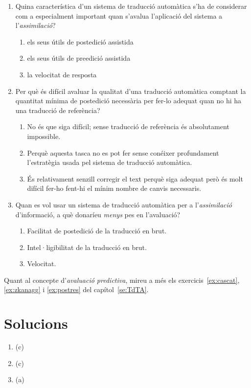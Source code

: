 \begin{enumerate}
\item Quina característica d'un sistema de traducció automàtica
   s'ha de considerar com a especialment important quan s'avalua
   l'aplicació del sistema a l'\emph{assimilació}?
   
\begin{enumerate}
\item els seus útils de postedició assistida
\item els seus útils de preedició assistida
\item la velocitat de resposta
\end{enumerate}

\item Per què és difícil avaluar la qualitat d'una traducció automàtica
   comptant la quantitat mínima de postedició necessària per fer-lo adequat
   quan no hi ha una traducció de referència?
   
\begin{enumerate}
\item No és que siga difícil; sense
      traducció de referència és absolutament impossible.
\item Perquè aquesta tasca no es pot fer sense conéixer
      profundament l'estratègia usada pel sistema de traducció
      automàtica.
\item És relativament senzill corregir el text perquè
      siga adequat però és molt difícil fer-ho fent-hi el mínim nombre
      de canvis necessaris.
\end{enumerate}

\item Quan es vol usar un sistema de traducció automàtica per a
  l'\emph{assimilació} d'informació, a què donaríeu \emph{menys} pes
  en l'avaluació?
   
\begin{enumerate}
\item Facilitat de postedició de la traducció en brut.
\item Intel·ligibilitat de la traducció en brut.
\item Velocitat.
\end{enumerate}



\end{enumerate}

Quant al concepte d'\emph{avaluació predictiva}, mireu a més els
exercicis~\ref{ex:cascat}, \ref{ex:zkanagg} i \ref{ex:postres} del capítol~\ref{se:TdTA}.


\section{Solucions}


\begin{enumerate}
\item (c)
\item (c)
\item (a)


\end{enumerate}


